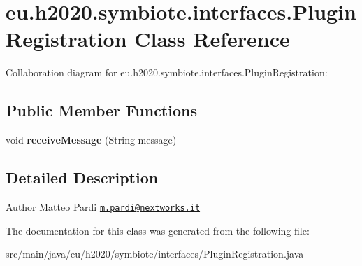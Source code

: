 \hypertarget{classeu_1_1h2020_1_1symbiote_1_1interfaces_1_1PluginRegistration}{}\section{eu.\+h2020.\+symbiote.\+interfaces.\+Plugin\+Registration Class Reference}
\label{classeu_1_1h2020_1_1symbiote_1_1interfaces_1_1PluginRegistration}


Collaboration diagram for eu.\+h2020.\+symbiote.\+interfaces.\+Plugin\+Registration\+:
\subsection*{Public Member Functions}
\begin{DoxyCompactItemize}
\item 
\mbox{\label{classeu_1_1h2020_1_1symbiote_1_1interfaces_1_1PluginRegistration_a97412b3c5e986cd18c4089759af5cb64}} 
void {\bfseries receive\+Message} (String message)
\end{DoxyCompactItemize}


\subsection{Detailed Description}
\begin{DoxyAuthor}{Author}
Matteo Pardi \href{mailto:m.pardi@nextworks.it}{\tt m.\+pardi@nextworks.\+it} 
\end{DoxyAuthor}


The documentation for this class was generated from the following file\+:\begin{DoxyCompactItemize}
\item 
src/main/java/eu/h2020/symbiote/interfaces/Plugin\+Registration.\+java\end{DoxyCompactItemize}
